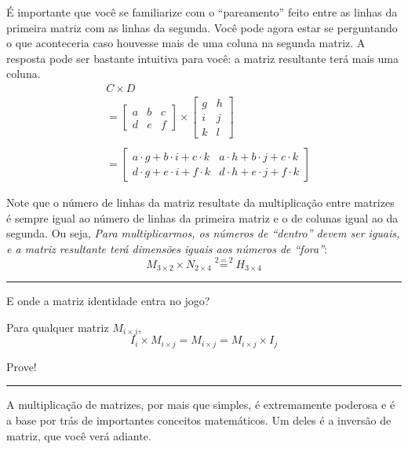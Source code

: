 \documentclass[
  portuguese,
  letterpaper,
  DIV=11,
  numbers=noendperiod]{scrreport}
\begin{document}
É importante que você se familiarize com o ``pareamento'' feito entre as
linhas da primeira matriz com as linhas da segunda. Você pode agora
estar se perguntando o que aconteceria caso houvesse mais de uma coluna
na segunda matriz. A resposta pode ser bastante intuitiva para você: a
matriz resultante terá mais uma coluna. \[
\begin{aligned}
    &C \times D  \\
    &= 
    \begin{bmatrix}
        a & b & c \\
        d & e & f
    \end{bmatrix}
    \times 
    \begin{bmatrix}
        g & h \\
        i & j\\
        k & l
    \end{bmatrix}\\  \\
    &=
    \begin{bmatrix}
        a \cdot g + b \cdot i + c \cdot k & a \cdot h + b \cdot j + c \cdot k\\
        d \cdot g + e \cdot i + f \cdot k & d \cdot h + e \cdot j + f \cdot k
    \end{bmatrix}
\end{aligned}
\]

Note que o número de linhas da matriz resultate da multiplicação entre
matrizes é sempre igual ao número de linhas da primeira matriz e o de
colunas igual ao da segunda. Ou seja, \emph{Para multiplicarmos, os
números de ``dentro'' devem ser iguais, e a matriz resultante terá
dimensões iguais aos números de ``fora''}: \[
M_{3\times 2} \times N_{2 \times 4} \stackrel{2=2}{=} H_{3 \times 4}
\]

\begin{center}\rule{0.5\linewidth}{0.5pt}\end{center}

E onde a matriz identidade entra no jogo?

Para qualquer matriz \(M_{i\times j}\), \[
I_{i} \times M_{i\times j} = M_{i\times j} = M_{i\times j}\times I_{j}
\]

Prove!

\begin{center}\rule{0.5\linewidth}{0.5pt}\end{center}

A multiplicação de matrizes, por mais que simples, é extremamente
poderosa e é a base por trás de importantes conceitos matemáticos. Um
deles é a inversão de matriz, que você verá adiante.
\end{document}
